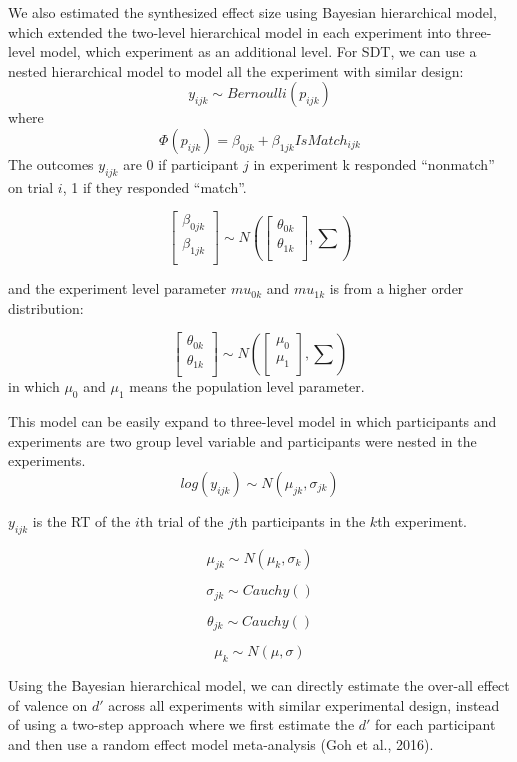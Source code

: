 \documentclass[
  english,
  man]{apa6}
\begin{document}
We also estimated the synthesized effect size using Bayesian hierarchical model, which extended the two-level hierarchical model in each experiment into three-level model, which experiment as an additional level. For SDT, we can use a nested hierarchical model to model all the experiment with similar design:
\[y_{ijk} \sim Bernoulli(p_{ijk})\]
where
\[ \Phi(p_{ijk}) =  \beta_{0jk} + \beta_{1jk}IsMatch_{ijk}\]
The outcomes \(y_{ijk}\) are 0 if participant \(j\) in experiment k responded \enquote{nonmatch} on trial \(i\), 1 if they responded \enquote{match}.

\[\begin{bmatrix}\beta_{0jk}\\
\beta_{1jk}\\
\end{bmatrix} \sim N(\begin{bmatrix}\theta_{0k}\\
\theta_{1k}\\
\end{bmatrix}, \sum)\]

and the experiment level parameter \(mu_{0k}\) and \(mu_{1k}\) is from a higher order distribution:

\[\begin{bmatrix}\theta_{0k}\\
\theta_{1k}\\
\end{bmatrix} \sim N(\begin{bmatrix}\mu_{0}\\
\mu_{1}\\
\end{bmatrix}, \sum)\]
in which \(\mu_{0}\) and \(\mu_{1}\) means the population level parameter.

This model can be easily expand to three-level model in which participants and experiments are two group level variable and participants were nested in the experiments.
\[ log(y_{ijk}) \sim N(\mu_{jk}, \sigma_{jk})\]

\(y_{ijk}\) is the RT of the \(i\)th trial of the \(j\)th participants in the \(k\)th experiment.

\[\mu_{jk} \sim N(\mu_{k}, \sigma_{k})\]

\[\sigma_{jk} \sim Cauchy()\]

\[\theta_{jk} \sim Cauchy()\]

\[\mu_{k} \sim N(\mu, \sigma)\]

Using the Bayesian hierarchical model, we can directly estimate the over-all effect of valence on \(d'\) across all experiments with similar experimental design, instead of using a two-step approach where we first estimate the \(d'\) for each participant and then use a random effect model meta-analysis (Goh et al., 2016).
\end{document}
